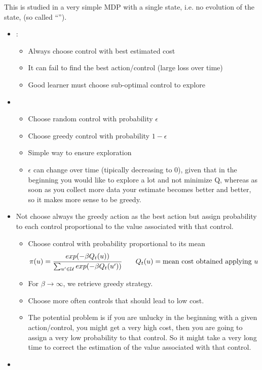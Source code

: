 This is studied in a very simple MDP with a single state, i.e. no evolution of the state, (so called ``'').

\begin{itemize}
\item {}:
\begin{itemize}
\item Always choose control with best estimated cost
\item It can fail to find the best action/control (large loss over time)
\item Good learner must choose sub-optimal control to explore
\end{itemize}
\item {}
\begin{itemize}
\item Choose random control with probability $\epsilon$
\item Choose greedy control with probability $1-\epsilon$
\item Simple way to ensure exploration
\item $\epsilon$ can change over time (tipically decreasing to 0), given that in the beginning you would like to explore a lot and not minimize Q, whereas as soon as you collect more data your estimate becomes better and better, so it makes more sense to be greedy.
\end{itemize}
\item {}

Not choose always the greedy action as the best action but assign probability to each control proportional to the value associated with that control.
\begin{itemize}
\item Choose control with probability proportional to its mean
\[\pi(u) = \cfrac{exp(-\beta Q_t(u))}{\sum_{u'\in\mathcal{U}}exp{(-\beta Q_t(u'))}}\qquad Q_t(u) =\text{mean cost obtained applying } u\]
\item For $\beta \rightarrow \infty$, we retrieve greedy strategy.
\item Choose more often controls that should lead to low cost.
\item The potential problem is if you are unlucky in the beginning with a given action/control, you might get a very high cost, then you are going to assign a very low probability to that control. So it might take a very long time to correct the estimation of the value associated with that control.
\end{itemize}
\item {}


\end{itemize}

